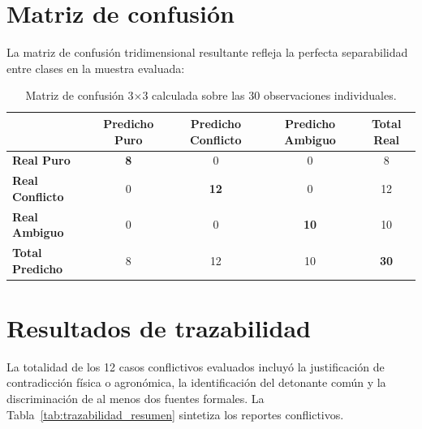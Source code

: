 \documentclass[11pt,a4paper]{article}
\begin{document}
\section{Matriz de confusión}
La matriz de confusión tridimensional resultante refleja la perfecta separabilidad entre clases en la muestra evaluada:

\begin{table}[H]
\centering
\caption{Matriz de confusión 3×3 calculada sobre las 30 observaciones individuales.}
\label{tab:matriz_confusion}
\begin{tabular}{lcccc}
\toprule
& \textbf{Predicho Puro} & \textbf{Predicho Conflicto} & \textbf{Predicho Ambiguo} & \textbf{Total Real} \\
\midrule
\textbf{Real Puro} & \textbf{8} & 0 & 0 & 8 \\
\textbf{Real Conflicto} & 0 & \textbf{12} & 0 & 12 \\
\textbf{Real Ambiguo} & 0 & 0 & \textbf{10} & 10 \\
\midrule
\textbf{Total Predicho} & 8 & 12 & 10 & \textbf{30} \\
\bottomrule
\end{tabular}
\end{table}

\section{Resultados de trazabilidad}
La totalidad de los 12 casos conflictivos evaluados incluyó la justificación de contradicción física o agronómica, la identificación del detonante común y la discriminación de al menos dos fuentes formales. La Tabla~\ref{tab:trazabilidad_resumen} sintetiza los reportes conflictivos.
\end{document}
